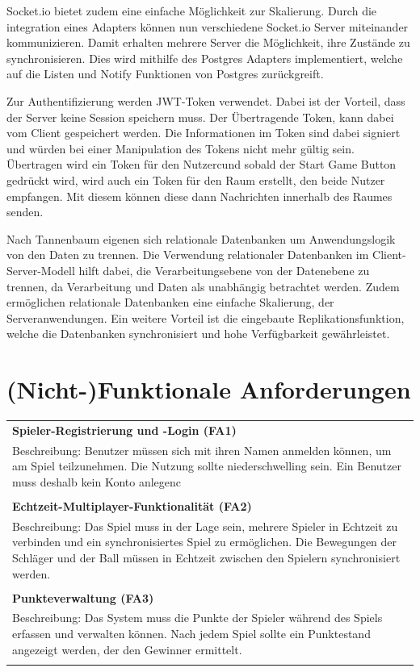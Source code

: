 \documentclass[
]{article}
\begin{document}
Socket.io bietet zudem eine einfache Möglichkeit zur Skalierung. Durch die integration
eines Adapters können nun verschiedene Socket.io Server miteinander kommunizieren.
Damit erhalten mehrere Server die Möglichkeit, ihre Zustände zu synchronisieren.
Dies wird mithilfe des Postgres Adapters implementiert, welche auf die Listen und Notify
Funktionen von Postgres zurückgreift. \cite[]{postgres-adapter}

Zur Authentifizierung werden JWT-Token verwendet. Dabei ist der Vorteil, dass der Server keine Session speichern muss.
Der Übertragende Token, kann dabei vom Client gespeichert werden. Die Informationen im Token sind
dabei signiert und würden bei einer Manipulation des Tokens nicht mehr gültig sein.
Übertragen wird ein Token für den Nutzercund sobald der Start Game Button gedrückt wird, wird auch 
ein Token für den Raum erstellt, den beide Nutzer empfangen.
Mit diesem können diese dann Nachrichten innerhalb des Raumes senden.

Nach Tannenbaum eigenen sich relationale Datenbanken um Anwendungslogik von den Daten zu trennen.
\glqq Die Verwendung relationaler Datenbanken im Client-Server-Modell hilft dabei, 
die Verarbeitungsebene von der Datenebene zu trennen, da Verarbeitung und Daten als unabhängig betrachtet werden.\grqq{} \cite[S. 40 ff.]{tanenbaum2007distributed}
Zudem ermöglichen relationale Datenbanken eine einfache Skalierung, der Serveranwendungen.
Ein weitere Vorteil ist die eingebaute Replikationsfunktion, welche die Datenbanken synchronisiert und hohe Verfügbarkeit gewährleistet.\cite[Chapter 27]{postgresql-high-availability}

\newpage
\section{(Nicht-)Funktionale Anforderungen}
\begin{center}
  \begin{tabular}{|p{\linewidth}|}
    \hline
    \textbf{Spieler-Registrierung und -Login (FA1)} \\
    Beschreibung: Benutzer müssen sich mit ihren Namen anmelden können, um am Spiel teilzunehmen.
    Die Nutzung sollte niederschwelling sein. Ein Benutzer muss deshalb kein Konto anlegenc \\ \\
    \hline
    \textbf{Echtzeit-Multiplayer-Funktionalität (FA2)} \\
    Beschreibung: Das Spiel muss in der Lage sein, mehrere Spieler in Echtzeit zu verbinden und ein synchronisiertes Spiel zu ermöglichen. Die Bewegungen der Schläger und der Ball müssen in Echtzeit zwischen den Spielern synchronisiert werden.\\ \\
    \hline
    \textbf{Punkteverwaltung (FA3)} \\
    Beschreibung: Das System muss die Punkte der Spieler während des Spiels erfassen und verwalten können. Nach jedem Spiel sollte ein Punktestand angezeigt werden, der den Gewinner ermittelt. \\ \\
    \hline
  \end{tabular}
\end{center}
\end{document}
